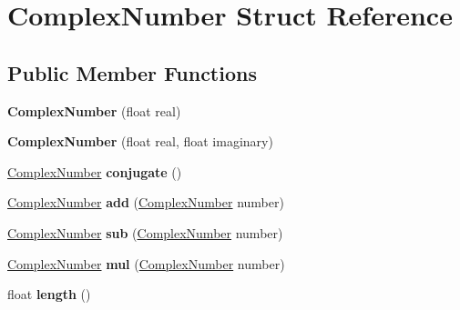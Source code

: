 \hypertarget{struct_complex_number}{\section{Complex\-Number Struct Reference}
\label{struct_complex_number}
}
\subsection*{Public Member Functions}
\begin{DoxyCompactItemize}
\item 
\hypertarget{struct_complex_number_a4e26bcbfd19e6f0a5896d6eccbcf434e}{{\bfseries Complex\-Number} (float real)}\label{struct_complex_number_a4e26bcbfd19e6f0a5896d6eccbcf434e}

\item 
\hypertarget{struct_complex_number_a0612677a9e4ee04225810ccfa7d7fa62}{{\bfseries Complex\-Number} (float real, float imaginary)}\label{struct_complex_number_a0612677a9e4ee04225810ccfa7d7fa62}

\item 
\hypertarget{struct_complex_number_aa591d5937f819abaf31fa575a94186d7}{\hyperlink{struct_complex_number}{Complex\-Number} {\bfseries conjugate} ()}\label{struct_complex_number_aa591d5937f819abaf31fa575a94186d7}

\item 
\hypertarget{struct_complex_number_a224292e9e396a82a2b98eb935292575a}{\hyperlink{struct_complex_number}{Complex\-Number} {\bfseries add} (\hyperlink{struct_complex_number}{Complex\-Number} number)}\label{struct_complex_number_a224292e9e396a82a2b98eb935292575a}

\item 
\hypertarget{struct_complex_number_affb193d5905c9e71bbfbe88121755ad9}{\hyperlink{struct_complex_number}{Complex\-Number} {\bfseries sub} (\hyperlink{struct_complex_number}{Complex\-Number} number)}\label{struct_complex_number_affb193d5905c9e71bbfbe88121755ad9}

\item 
\hypertarget{struct_complex_number_ac09bae750130087b9264055d0ab47a99}{\hyperlink{struct_complex_number}{Complex\-Number} {\bfseries mul} (\hyperlink{struct_complex_number}{Complex\-Number} number)}\label{struct_complex_number_ac09bae750130087b9264055d0ab47a99}

\item 
\hypertarget{struct_complex_number_a9686721e447c8c0484cf78a34410b605}{float {\bfseries length} ()}\label{struct_complex_number_a9686721e447c8c0484cf78a34410b605}


\end{DoxyCompactItemize}

